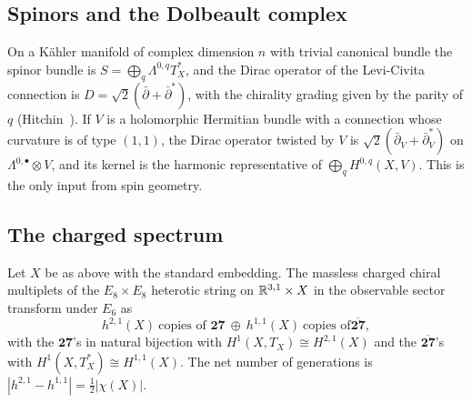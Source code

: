 \subsection{Spinors and the Dolbeault complex}

On a K\"ahler manifold of complex dimension $n$ with trivial canonical
bundle the spinor bundle is $S=\bigoplus_{q}\Lambda^{0,q}T^*_X$, and the
Dirac operator of the Levi-Civita connection is $D=\sqrt2(\bar\partial+
\bar\partial^*)$, with the chirality grading given by the parity of $q$
(Hitchin~\cite{Hit74}). If $V$ is a holomorphic Hermitian bundle with a
connection whose curvature is of type $(1,1)$, the Dirac operator twisted by
$V$ is $\sqrt2(\bar\partial_V+\bar\partial_V^*)$ on $\Lambda^{0,\bullet}
\otimes V$, and its kernel is the harmonic representative of
$\bigoplus_q H^{0,q}(X,V)$. This is the only input from spin geometry.

\subsection{The charged spectrum}

\begin{theorem}\label{thm:dictionary}
Let $X$ be as above with the standard embedding. The massless charged
chiral multiplets of the $E_8\times E_8$ heterotic string on $\mathbb{R}^{3,1}
\times X$ in the observable sector transform under $E_6$ as
\[
h^{2,1}(X)\ \text{copies of }\mathbf{27}\ \oplus\ h^{1,1}(X)\ \text{copies of
}\overline{\mathbf{27}},
\]
with the $\mathbf{27}$'s in natural bijection with $H^1(X,T_X)\cong
H^{2,1}(X)$ and the $\overline{\mathbf{27}}$'s with $H^1(X,T_X^*)\cong
H^{1,1}(X)$. The net number of generations is
$|h^{2,1}-h^{1,1}|=\tfrac12|\chi(X)|$.
\end{theorem}

